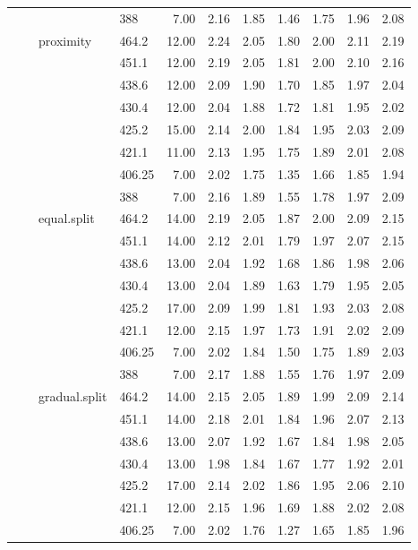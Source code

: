 \begin{longtable}{llllrrrrrrr}
   &  &  & 388 & 7.00 & 2.16 & 1.85 & 1.46 & 1.75 & 1.96 & 2.08 \\ 
   &  & proximity & 464.2 & 12.00 & 2.24 & 2.05 & 1.80 & 2.00 & 2.11 & 2.19 \\ 
   &  &  & 451.1 & 12.00 & 2.19 & 2.05 & 1.81 & 2.00 & 2.10 & 2.16 \\ 
   &  &  & 438.6 & 12.00 & 2.09 & 1.90 & 1.70 & 1.85 & 1.97 & 2.04 \\ 
   &  &  & 430.4 & 12.00 & 2.04 & 1.88 & 1.72 & 1.81 & 1.95 & 2.02 \\ 
   &  &  & 425.2 & 15.00 & 2.14 & 2.00 & 1.84 & 1.95 & 2.03 & 2.09 \\ 
   &  &  & 421.1 & 11.00 & 2.13 & 1.95 & 1.75 & 1.89 & 2.01 & 2.08 \\ 
   &  &  & 406.25 & 7.00 & 2.02 & 1.75 & 1.35 & 1.66 & 1.85 & 1.94 \\ 
   &  &  & 388 & 7.00 & 2.16 & 1.89 & 1.55 & 1.78 & 1.97 & 2.09 \\ 
   &  & equal.split & 464.2 & 14.00 & 2.19 & 2.05 & 1.87 & 2.00 & 2.09 & 2.15 \\ 
   &  &  & 451.1 & 14.00 & 2.12 & 2.01 & 1.79 & 1.97 & 2.07 & 2.15 \\ 
   &  &  & 438.6 & 13.00 & 2.04 & 1.92 & 1.68 & 1.86 & 1.98 & 2.06 \\ 
   &  &  & 430.4 & 13.00 & 2.04 & 1.89 & 1.63 & 1.79 & 1.95 & 2.05 \\ 
   &  &  & 425.2 & 17.00 & 2.09 & 1.99 & 1.81 & 1.93 & 2.03 & 2.08 \\ 
   &  &  & 421.1 & 12.00 & 2.15 & 1.97 & 1.73 & 1.91 & 2.02 & 2.09 \\ 
   &  &  & 406.25 & 7.00 & 2.02 & 1.84 & 1.50 & 1.75 & 1.89 & 2.03 \\ 
   &  &  & 388 & 7.00 & 2.17 & 1.88 & 1.55 & 1.76 & 1.97 & 2.09 \\ 
   &  & gradual.split & 464.2 & 14.00 & 2.15 & 2.05 & 1.89 & 1.99 & 2.09 & 2.14 \\ 
   &  &  & 451.1 & 14.00 & 2.18 & 2.01 & 1.84 & 1.96 & 2.07 & 2.13 \\ 
   &  &  & 438.6 & 13.00 & 2.07 & 1.92 & 1.67 & 1.84 & 1.98 & 2.05 \\ 
   &  &  & 430.4 & 13.00 & 1.98 & 1.84 & 1.67 & 1.77 & 1.92 & 2.01 \\ 
   &  &  & 425.2 & 17.00 & 2.14 & 2.02 & 1.86 & 1.95 & 2.06 & 2.10 \\ 
   &  &  & 421.1 & 12.00 & 2.15 & 1.96 & 1.69 & 1.88 & 2.02 & 2.08 \\ 
   &  &  & 406.25 & 7.00 & 2.02 & 1.76 & 1.27 & 1.65 & 1.85 & 1.96 \\ 

\end{longtable}
